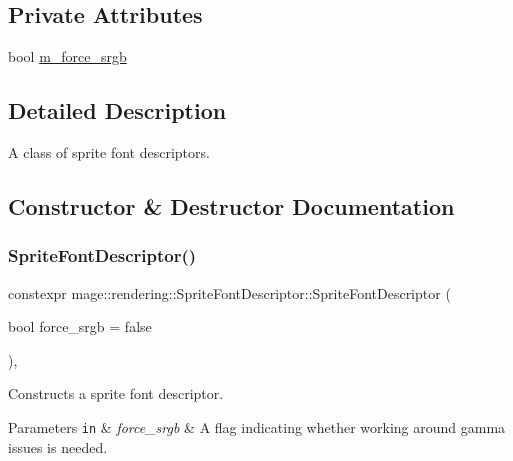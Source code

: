 \subsection*{Private Attributes}
\begin{DoxyCompactItemize}
\item 
bool \hyperlink{classmage_1_1rendering_1_1_sprite_font_descriptor_abfb5c7d28df254c483c489be55736c76}{m\+\_\+force\+\_\+srgb}
\end{DoxyCompactItemize}


\subsection{Detailed Description}
A class of sprite font descriptors. 

\subsection{Constructor \& Destructor Documentation}
\hypertarget{classmage_1_1rendering_1_1_sprite_font_descriptor_a82c66afe6cc815ad223c15642cd2ac00}{}\label{classmage_1_1rendering_1_1_sprite_font_descriptor_a82c66afe6cc815ad223c15642cd2ac00} 
\subsubsection{\texorpdfstring{Sprite\+Font\+Descriptor()}{SpriteFontDescriptor()}\hspace{0.1cm}{\footnotesize\ttfamily [1/3]}}
{\footnotesize\ttfamily constexpr mage\+::rendering\+::\+Sprite\+Font\+Descriptor\+::\+Sprite\+Font\+Descriptor (\begin{DoxyParamCaption}\item[{bool}]{force\+\_\+srgb = {\ttfamily false} }\end{DoxyParamCaption})\hspace{0.3cm}{\ttfamily [explicit]}, {\ttfamily [noexcept]}}

Constructs a sprite font descriptor.


\begin{DoxyParams}[1]{Parameters}
\mbox{\tt in}  & {\em force\+\_\+srgb} & A flag indicating whether working around gamma issues is needed. \\
\hline
\end{DoxyParams}
\hypertarget{classmage_1_1rendering_1_1_sprite_font_descriptor_a168e12be8a7029e5f5dcffe058100bd6}{}\label{classmage_1_1rendering_1_1_sprite_font_descriptor_a168e12be8a7029e5f5dcffe058100bd6} 
